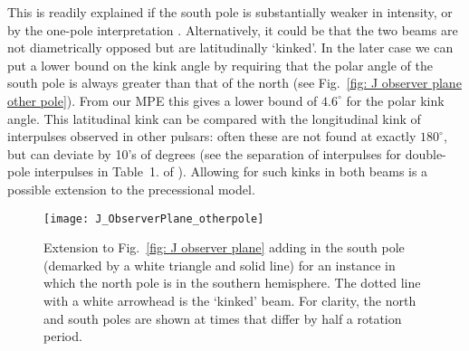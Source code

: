 \documentclass[../full_thesis/full_thesis.tex]{subfiles}
\newcommand{\degr}{^{\circ}}
\begin{document}
\begin{subappendices}
This is readily explained if the south pole is substantially weaker in
intensity, or by the one-pole interpretation \citet{Manchester1977}.
Alternatively, it could be that  the two beams are not diametrically opposed
but are latitudinally `kinked'. In the later case we can put a lower bound on
the kink angle by requiring that the polar angle of the south pole is always
greater than that of the north (see Fig.~\ref{fig: J observer  plane other
pole}). From our MPE this gives a lower bound of $4.6\degr$ for the polar kink
angle. This latitudinal kink can be compared with the longitudinal kink of
interpulses observed in other pulsars: often these are not found at exactly
$180\degr$, but can deviate by 10's of degrees (see the separation of
interpulses for double-pole interpulses in Table~1. of \cite{Maciesiak2011}).
Allowing for such kinks in both beams is a possible extension to the
precessional model.

\begin{figure}
\centering
\texttt{[image: J\_ObserverPlane\_otherpole]}
\caption{Extension to Fig.~\ref{fig: J observer plane} adding in the south pole
(demarked by a white triangle and solid line) for an instance in which the
north pole is in the southern hemisphere. The dotted line with a white
arrowhead is the `kinked' beam.  For clarity, the north and south poles are
shown at times that differ by half a rotation period.}
\label{fig: J observer plane other pole}
\end{figure}
\end{subappendices}
\end{document}
